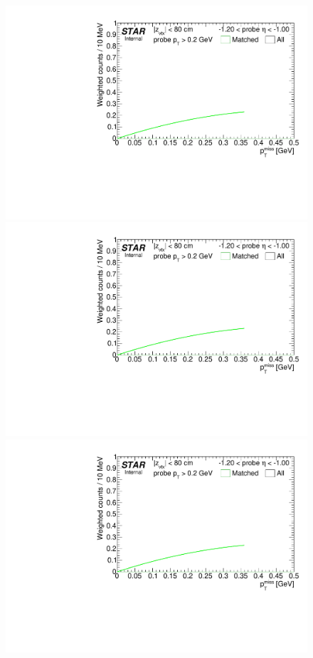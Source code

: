 \begin{figure}
{  \includegraphics[width=\linewidth,page=3]{graphics/systematicsEfficiency/TOF_tagAndProbe/Fitting_effVsEta_mc.CPT.pdf}\\
  \includegraphics[width=\linewidth,page=4]{graphics/systematicsEfficiency/TOF_tagAndProbe/Fitting_effVsEta_mc.CPT.pdf}\\
  \includegraphics[width=\linewidth,page=5]{graphics/systematicsEfficiency/TOF_tagAndProbe/Fitting_effVsEta_mc.CPT.pdf}\\
}%
\end{figure}
